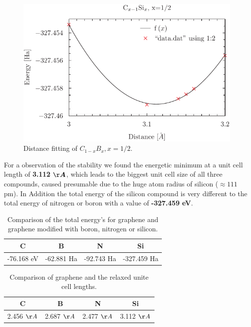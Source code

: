 				\begin{figure}
					\includegraphics[width=\textwidth]{Results/Silicon/Silicon1R/data.pdf}
					\caption{Distance fitting of $C_{1-x}B_x,x= 1 / 2$.}
					\label{fig:siliconFitting}
				\end{figure}
				For a observation of the stability we found the energetic minimum at a unit cell length of \textbf{3.112} $\boldsymbol{\AA}$, which leads to the biggest unit cell size of all three compounds, caused presumable due to the huge atom radius of silicon ($\approx 111$ pm).
				In Addition the total energy of the silicon compound is very different to the total energy of nitrogen or boron with a value of \textbf{-327.459 eV}.
				\begin{table}[H]
					\centering
					\begin{tabular}{cccc}
						\midrule
						C & B & N & Si \\
						\midrule 
						-76.168 eV & -62.881 Ha & -92.743 Ha & -327.459 Ha \\
						\bottomrule
					\end{tabular}
					\caption{Comparison of the total energy's for graphene and graphene modified with boron, nitrogen or silicon.}
				\end{table}
				\begin{table}[H]
					\centering
					\begin{tabular}{cccc}
						\midrule
						C & B & N & Si \\
						\midrule 
						2.456 $\AA$ & 2.687 $\AA$ & 2.477 $\AA$ & 3.112 $\AA$ \\
						\bottomrule
					\end{tabular}
					\caption{Comparison of graphene and the relaxed unite cell lengths.}
				\end{table}				

